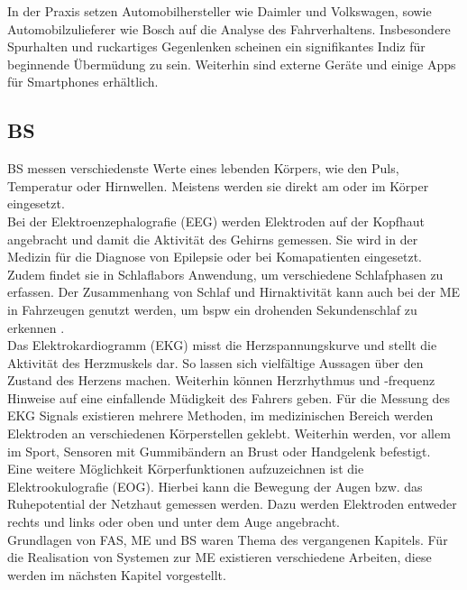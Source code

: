 {In der Praxis setzen Automobilhersteller wie Daimler \cite{Daimler} und Volkswagen, sowie Automobilzulieferer wie Bosch \cite{Bosch} auf die Analyse des Fahrverhaltens. Insbesondere Spurhalten und ruckartiges Gegenlenken scheinen ein signifikantes Indiz für beginnende Übermüdung zu sein. Weiterhin sind externe Geräte und einige Apps für Smartphones erhältlich.

\subsection{\acl{BS}}
\acl{BS} messen verschiedenste Werte eines lebenden Körpers, wie den Puls, Temperatur oder Hirnwellen. Meistens werden sie direkt am oder im Körper eingesetzt.\\

Bei der Elektroenzephalografie (EEG) werden Elektroden auf der Kopfhaut angebracht und damit die Aktivität des Gehirns gemessen. Sie wird in der Medizin für die Diagnose von Epilepsie oder bei Komapatienten eingesetzt. Zudem findet sie in Schlaflabors Anwendung, um verschiedene Schlafphasen zu erfassen. Der Zusammenhang von Schlaf und Hirnaktivität kann auch bei der \acl{ME} in Fahrzeugen genutzt werden, um \acl{bspw} ein drohenden Sekundenschlaf zu erkennen \cite{Santamaria_eeg}. \\

Das Elektrokardiogramm (EKG) misst die Herzspannungskurve und stellt die Aktivität des Herzmuskels dar. So lassen sich vielfältige Aussagen über den Zustand des Herzens machen. Weiterhin können Herzrhythmus und -frequenz Hinweise auf eine einfallende Müdigkeit des Fahrers geben. Für die Messung des EKG Signals existieren mehrere Methoden, im medizinischen Bereich werden Elektroden an verschiedenen Körperstellen geklebt. Weiterhin werden, vor allem im Sport, Sensoren mit Gummibändern an Brust oder Handgelenk befestigt. \\

Eine weitere Möglichkeit Körperfunktionen aufzuzeichnen ist die Elektrookulografie (EOG). Hierbei kann die Bewegung der Augen bzw. das Ruhepotential der Netzhaut gemessen werden. Dazu werden Elektroden entweder rechts und links oder oben und unter dem Auge angebracht.\\

Grundlagen von \acl{FAS}, \acl{ME} und \acl{BS} waren Thema des vergangenen Kapitels. Für die Realisation von Systemen zur \acl{ME} existieren verschiedene Arbeiten, diese werden im nächsten Kapitel vorgestellt.

}
